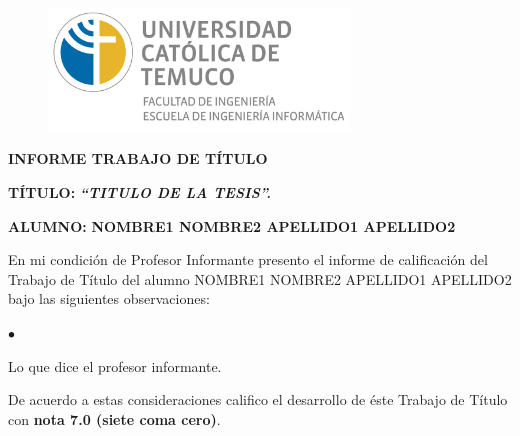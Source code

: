 
\thispagestyle{empty}
\begin{titlepage}

{
\begin{center}
\vspace*{-1in}
\begin{figure}[htb]
\begin{center}
\includegraphics[width=8cm]{./figuras/logo_informatica.jpg}
\end{center}
\end{figure}

\vspace*{0.2in}
\textbf{ \normalsize{INFORME TRABAJO DE TÍTULO}} \\
\vspace*{0.2in}
\begin{flushleft}
\textbf{ \normalsize{TÍTULO:}} \hspace*{0.2in} \textbf{ \textit{ \normalsize{``TITULO DE LA TESIS''.}}}
\end{flushleft}
\vspace*{0.1in}
\begin{flushleft}
\textbf{ \normalsize{ALUMNO:}} \hspace*{0.2in} \textbf{ \normalsize{NOMBRE1 NOMBRE2 APELLIDO1 APELLIDO2}}
\end{flushleft}
\vspace*{0.3in}

\begin{flushleft}

\hspace{1cm} En mi condición de Profesor Informante presento el informe de calificación del Trabajo de Título del alumno
  NOMBRE1 NOMBRE2 APELLIDO1 APELLIDO2 bajo las siguientes observaciones:

\begin{list}{$\bullet$}{}
  \item Lo que dice el profesor informante.
\end{list}

\hspace{1cm} De acuerdo a estas consideraciones califico el desarrollo de éste Trabajo de Título con \textbf {nota 7.0 (siete coma cero)}.
\end{flushleft}


\end{center}}
\end{titlepage}
